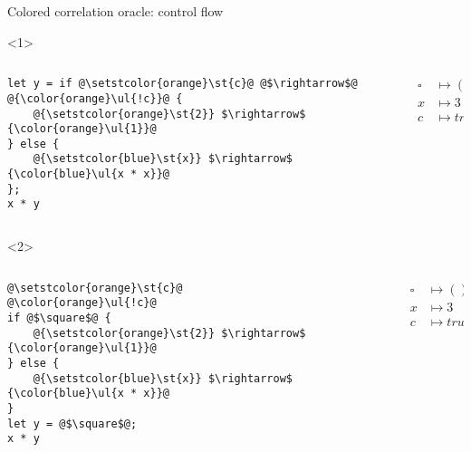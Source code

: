 \documentclass{beamer}
\makeatletter
\let\UL\ul
\renewcommand\ul{%
  \let\set@color\beamerorig@set@color
  \let\reset@color\beamerorig@reset@color
  \UL}
\let\ST\st
\renewcommand\st{%
  \let\set@color\beamerorig@set@color
  \let\reset@color\beamerorig@reset@color
  \ST}
\makeatother
\begin{document}
\begin{frame}[fragile]{Colored correlation oracle: control flow}
\begin{onlyenv}<1>
\begin{columns}
\begin{column}{0.45\textwidth}
\begin{lstlisting}
let y = if @\setstcolor{orange}\st{c}@ @$\rightarrow$@ @{\color{orange}\ul{!c}}@ {
    @{\setstcolor{orange}\st{2}} $\rightarrow$ {\color{orange}\ul{1}}@
} else {
    @{\setstcolor{blue}\st{x}} $\rightarrow$ {\color{blue}\ul{x * x}}@
};
x * y
\end{lstlisting}
\end{column}
\begin{column}{0.45\textwidth}
\begin{align*}
\square &\mapsto ()\\
x &\mapsto 3\\
c &\mapsto true\\
\end{align*}
\end{column}
\end{columns}
\end{onlyenv}

\begin{onlyenv}<2>
\begin{columns}
\begin{column}{0.45\textwidth}
\begin{lstlisting}
@\setstcolor{orange}\st{c}@
@\color{orange}\ul{!c}@
if @$\square$@ {
    @{\setstcolor{orange}\st{2}} $\rightarrow$ {\color{orange}\ul{1}}@
} else {
    @{\setstcolor{blue}\st{x}} $\rightarrow$ {\color{blue}\ul{x * x}}@
}
let y = @$\square$@;
x * y
\end{lstlisting}
\end{column}
\begin{column}{0.45\textwidth}
\begin{align*}
\square &\mapsto ()\\
x &\mapsto 3\\
c &\mapsto true\\
\end{align*}
\end{column}
\end{columns}
\end{onlyenv}


\end{frame}
\end{document}
